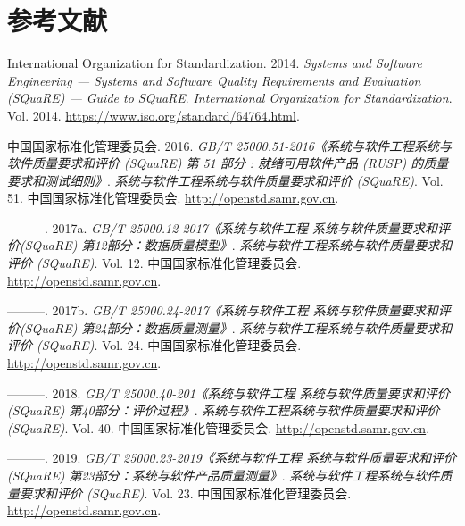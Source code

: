 \documentclass[hyperref, a4paper]{ctexart}
\begin{document}
\hypertarget{ux53c2ux8003ux6587ux732e}{%
\section*{参考文献}\label{ux53c2ux8003ux6587ux732e}}

\hypertarget{refs}{}
\leavevmode\hypertarget{ref-innovativeInternationalisation}{}%
International Organization for Standardization. 2014. \emph{Systems and
Software Engineering --- Systems and Software Quality Requirements and
Evaluation (SQuaRE) --- Guide to SQuaRE}. \emph{International
Organization for Standardization}. Vol. 2014.
\url{https://www.iso.org/standard/64764.html}.

\leavevmode\hypertarget{ref-innovative1}{}%
中国国家标准化管理委员会. 2016. \emph{GB/T
25000.51-2016《系统与软件工程系统与软件质量要求和评价 (SQuaRE) 第 51
部分 : 就绪可用软件产品 (RUSP) 的质量要求和测试细则》}.
\emph{系统与软件工程系统与软件质量要求和评价 (SQuaRE)}. Vol. 51.
中国国家标准化管理委员会. \url{http://openstd.samr.gov.cn}.

\leavevmode\hypertarget{ref-innovative3}{}%
---------. 2017a. \emph{GB/T 25000.12-2017《系统与软件工程
系统与软件质量要求和评价(SQuaRE) 第12部分：数据质量模型》}.
\emph{系统与软件工程系统与软件质量要求和评价 (SQuaRE)}. Vol. 12.
中国国家标准化管理委员会. \url{http://openstd.samr.gov.cn}.

\leavevmode\hypertarget{ref-innovative4}{}%
---------. 2017b. \emph{GB/T 25000.24-2017《系统与软件工程
系统与软件质量要求和评价(SQuaRE) 第24部分：数据质量测量》}.
\emph{系统与软件工程系统与软件质量要求和评价 (SQuaRE)}. Vol. 24.
中国国家标准化管理委员会. \url{http://openstd.samr.gov.cn}.

\leavevmode\hypertarget{ref-innovative5}{}%
---------. 2018. \emph{GB/T 25000.40-201《系统与软件工程
系统与软件质量要求和评价(SQuaRE) 第40部分：评价过程》}.
\emph{系统与软件工程系统与软件质量要求和评价 (SQuaRE)}. Vol. 40.
中国国家标准化管理委员会. \url{http://openstd.samr.gov.cn}.

\leavevmode\hypertarget{ref-innovative2}{}%
---------. 2019. \emph{GB/T 25000.23-2019《系统与软件工程
系统与软件质量要求和评价(SQuaRE) 第23部分：系统与软件产品质量测量》}.
\emph{系统与软件工程系统与软件质量要求和评价 (SQuaRE)}. Vol. 23.
中国国家标准化管理委员会. \url{http://openstd.samr.gov.cn}.
\end{document}
